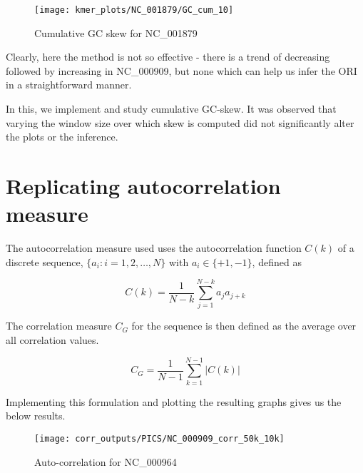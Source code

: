 \documentclass[10pt]{article}
\begin{document}
\begin{figure}[H]
\centering
\texttt{[image: kmer\_plots/NC\_001879/GC\_cum\_10]}
\captionsetup{justification=centering}
\caption{Cumulative GC skew for NC\_001879 }
\end{figure}


Clearly, here the method is not so effective - there is a trend of decreasing followed by increasing in NC\_000909, but none which can help us infer the ORI in a straightforward manner.

In this, we implement and study cumulative GC-skew. It was observed that varying the window size over which skew is computed did not significantly alter the plots or the inference. 

\section{Replicating autocorrelation measure}
The autocorrelation measure used uses the autocorrelation function $C(k)$ of a discrete sequence, $\{a_i:i=1,2,\hdots,N\}$ with $a_i \in \{+1, -1\}$, defined as

\begin{equation}
C(k) = \frac{1}{N-k}\sum_{j=1}^{N-k}a_j a_{j+k}
\end{equation}

The correlation measure $C_G$ for the sequence is then defined as the average over all correlation values.

\begin{equation}
C_G = \frac{1}{N-1}\sum_{k=1}^{N-1}|C(k)|
\end{equation}

Implementing this formulation and plotting the resulting graphs gives us the below results.


\begin{figure}[H]
\centering
\texttt{[image: corr\_outputs/PICS/NC\_000909\_corr\_50k\_10k]}
\captionsetup{justification=centering}
\caption{Auto-correlation for NC\_000964 }
\end{figure}
\end{document}
